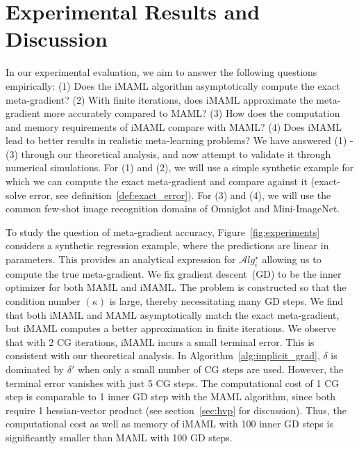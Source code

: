 \documentclass{article} \usepackage[nonatbib, final]{mod_neurips}
\newcommand{\algstar}{\mathcal{A}lg^\star}
\begin{document}
 \section{Experimental Results and Discussion}
\label{sec:experiments}
In our experimental evaluation, we aim to answer the following questions empirically: (1) Does the iMAML algorithm asymptotically compute the exact meta-gradient? (2) With finite iterations, does iMAML approximate the meta-gradient more accurately compared to MAML? (3) How does the computation and memory requirements of iMAML compare with MAML? (4) Does iMAML lead to better results in realistic meta-learning problems?
We have answered (1) - (3) through our theoretical analysis, and now attempt to validate it through numerical simulations. For (1) and (2), we will use a simple synthetic example for which we can compute the exact meta-gradient and compare against it (exact-solve error, see definition~\ref{def:exact_error}). For (3) and (4), we will use the common few-shot image recognition domains of Omniglot and Mini-ImageNet.



To study the question of meta-gradient accuracy, Figure~\ref{fig:experiments} considers a synthetic regression example, where the predictions are linear in parameters. This provides an analytical expression for $\algstar_i$ allowing us to compute the true meta-gradient. We fix gradient descent~(GD) to be the inner optimizer for both MAML and iMAML. The problem is constructed so that the condition number $(\kappa)$ is large, thereby necessitating many GD steps. We find that both iMAML and MAML asymptotically match the exact meta-gradient, but iMAML computes a better approximation in finite iterations. 
We observe that with 2 CG iterations, iMAML incurs a small terminal error. This is consistent with our theoretical analysis. In Algorithm~\ref{alg:implicit_grad}, $\delta$ is dominated by $\delta'$ when only a small number of CG steps are used. However, the terminal error vanishes with just 5 CG steps. The computational cost of 1 CG step is comparable to 1 inner GD step with the MAML algorithm, since both require 1 hessian-vector product (see section~\ref{sec:hvp} for discussion). Thus, the computational cost as well as memory of iMAML with 100 inner GD steps is significantly smaller than MAML with 100 GD steps.
\end{document}
